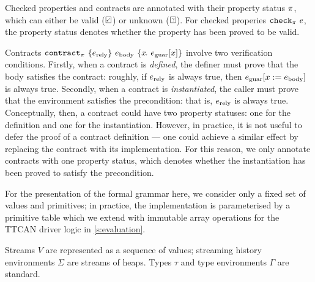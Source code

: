 \documentclass[a4paper,UKenglish,cleveref, autoref, thm-restate,anonymous]{lipics-v2021}
\begin{document}
Checked properties and contracts are annotated with their property status $\pi$, which can either be valid ($\PSValid$) or unknown ($\PSUnknown$).
For checked properies $\texttt{check}_{\pi}~e$, the property status denotes whether the property has been proved to be valid.

Contracts $\texttt{contract}_{\pi}~\{e_{\text{rely}}\}~e_{\text{body}}~\{x\hspace{-0.1em}.~e_{\text{guar}}[x]\}$ involve two verification conditions.
Firstly, when a contract is \emph{defined}, the definer must prove that the body satisfies the contract: roughly, if $e_{\text{rely}}$ is always true, then $e_{\text{guar}}[x := e_{\text{body}}]$ is always true.
Secondly, when a contract is \emph{instantiated}, the caller must prove that the environment satisfies the precondition: that is, $e_{\text{rely}}$ is always true.
Conceptually, then, a contract could have two property statuses: one for the definition and one for the instantiation.
However, in practice, it is not useful to defer the proof of a contract definition --- one could achieve a similar effect by replacing the contract with its implementation.
For this reason, we only annotate contracts with one property status, which denotes whether the instantiation has been proved to satisfy the precondition.

For the presentation of the formal grammar here, we consider only a fixed set of values and primitives; in practice, the implementation is parameterised by a primitive table which we extend with immutable array operations for the TTCAN driver logic in \autoref{s:evaluation}.

Streams $V$ are represented as a sequence of values; streaming history environments $\Sigma$ are streams of heaps.
Types $\tau$ and type environments $\Gamma$ are standard.
\end{document}
